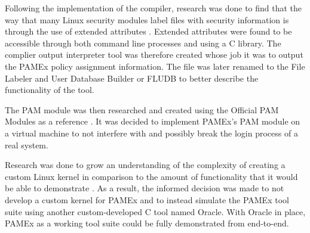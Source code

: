 Following the implementation of the compiler, research was done 
to find that the way that many Linux security modules label files with 
security information is through the use of extended attributes \cite{selinux}. 
Extended attributes were found to be accessible through both command 
line processes and using a C library. The complier output interpreter 
tool was therefore created whose job it was to output the PAMEx policy 
assignment information. The file was later renamed to the File Labeler 
and User Database Builder or FLUDB to better describe the functionality 
of the tool.  

The PAM module was then researched and created using the 
Official PAM Modules as a reference \cite{linuxpam}. It was decided to implement 
PAMEx’s PAM module on a virtual machine to not interfere with and 
possibly break the login process of a real system. 

Research was done to grow an understanding of the complexity of 
creating a custom Linux kernel in comparison to the amount of 
functionality that it would be able to demonstrate \cite{kerneldocs}. As a result, 
the informed decision was made to not develop a custom kernel for 
PAMEx and to instead simulate the PAMEx tool suite using another 
custom-developed C tool named Oracle. With Oracle in place, PAMEx as a 
working tool suite could be fully demonstrated from end-to-end. 
\vspace{\baselineskip}
